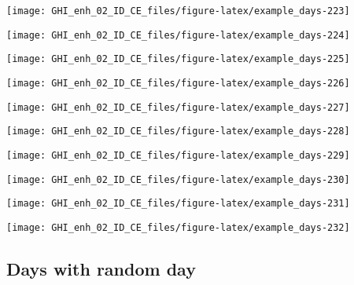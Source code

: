 \documentclass[
  10pt,
  a4paper,oneside]{article}
\begin{document}
\begin{center}\texttt{[image: GHI\_enh\_02\_ID\_CE\_files/figure-latex/example\_days-223]} \end{center}

\begin{center}\texttt{[image: GHI\_enh\_02\_ID\_CE\_files/figure-latex/example\_days-224]} \end{center}

\begin{center}\texttt{[image: GHI\_enh\_02\_ID\_CE\_files/figure-latex/example\_days-225]} \end{center}

\begin{center}\texttt{[image: GHI\_enh\_02\_ID\_CE\_files/figure-latex/example\_days-226]} \end{center}

\begin{center}\texttt{[image: GHI\_enh\_02\_ID\_CE\_files/figure-latex/example\_days-227]} \end{center}

\begin{center}\texttt{[image: GHI\_enh\_02\_ID\_CE\_files/figure-latex/example\_days-228]} \end{center}

\begin{center}\texttt{[image: GHI\_enh\_02\_ID\_CE\_files/figure-latex/example\_days-229]} \end{center}

\begin{center}\texttt{[image: GHI\_enh\_02\_ID\_CE\_files/figure-latex/example\_days-230]} \end{center}

\begin{center}\texttt{[image: GHI\_enh\_02\_ID\_CE\_files/figure-latex/example\_days-231]} \end{center}

\begin{center}\texttt{[image: GHI\_enh\_02\_ID\_CE\_files/figure-latex/example\_days-232]} \end{center}

\FloatBarrier

\hypertarget{days-with-random-day}{%
\subsection{Days with random day}\label{days-with-random-day}}
\end{document}
